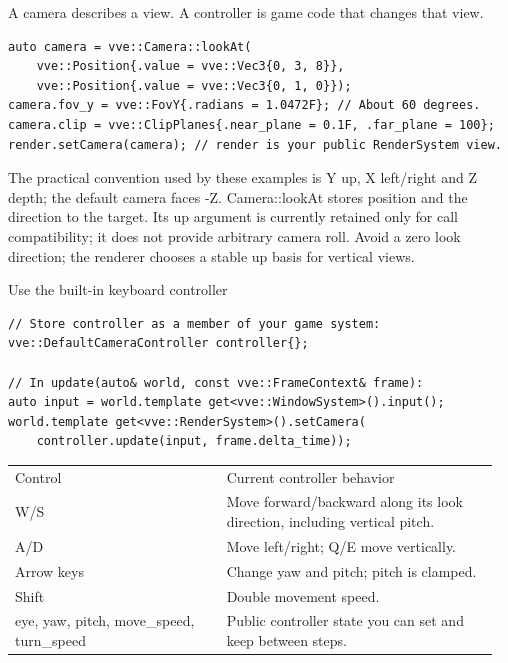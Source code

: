 \documentclass[11pt,a4paper]{article}
\begin{document}
\label{core-59}
A camera describes a view. A controller is game code that changes that view.

\begin{lstlisting}[language={}]
auto camera = vve::Camera::lookAt(
    vve::Position{.value = vve::Vec3{0, 3, 8}},
    vve::Position{.value = vve::Vec3{0, 1, 0}});
camera.fov_y = vve::FovY{.radians = 1.0472F}; // About 60 degrees.
camera.clip = vve::ClipPlanes{.near_plane = 0.1F, .far_plane = 100};
render.setCamera(camera); // render is your public RenderSystem view.
\end{lstlisting}

The practical convention used by these examples is Y up, X left/right and Z depth; the default camera faces -Z. Camera::lookAt stores position and the direction to the target. Its up argument is currently retained only for call compatibility; it does not provide arbitrary camera roll. Avoid a zero look direction; the renderer chooses a stable up basis for vertical views.

Use the built-in keyboard controller

\begin{lstlisting}[language={}]
// Store controller as a member of your game system:
vve::DefaultCameraController controller{};

// In update(auto& world, const vve::FrameContext& frame):
auto input = world.template get<vve::WindowSystem>().input();
world.template get<vve::RenderSystem>().setCamera(
    controller.update(input, frame.delta_time));
\end{lstlisting}

{\small
\begin{longtable}{@{}p{0.42\linewidth}p{0.54\linewidth}@{}}
Control & Current controller behavior \\
W/S & Move forward/backward along its look direction, including vertical pitch. \\
A/D & Move left/right; Q/E move vertically. \\
Arrow keys & Change yaw and pitch; pitch is clamped. \\
Shift & Double movement speed. \\
eye, yaw, pitch, move\_speed, turn\_speed & Public controller state you can set and keep between steps. \\
\end{longtable}
}
\end{document}
